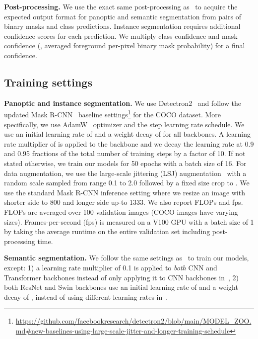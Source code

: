 \documentclass[10pt,twocolumn,letterpaper]{article}
\begin{document}
\noindent\textbf{Post-processing.} We use the exact same post-processing as~\cite{cheng2021maskformer} to acquire the expected output format for panoptic and semantic segmentation from pairs of binary masks and class predictions. Instance segmentation requires additional confidence scores for each prediction. We multiply class confidence and mask confidence (\ie, averaged foreground per-pixel binary mask probability) for a final confidence. 

\subsection{Training settings}
\noindent\textbf{Panoptic and instance segmentation.} We use Detectron2~\cite{wu2019detectron2} and follow the updated Mask R-CNN~\cite{he2017mask} baseline settings\footnote{\scriptsize \url{https://github.com/facebookresearch/detectron2/blob/main/MODEL\_ZOO.md\#new-baselines-using-large-scale-jitter-and-longer-training-schedule}} for the COCO dataset. More specifically, we use AdamW~\cite{loshchilov2018decoupled} optimizer and the step learning rate  schedule. We use an initial learning rate of  and a weight decay of  for all backbones. A learning rate multiplier of  is applied to the backbone and we decay the learning rate at 0.9 and 0.95 fractions of the total number of training steps by a factor of 10. If not stated otherwise, we train our models for 50 epochs with a batch size of 16. For data augmentation, we use the large-scale jittering (LSJ) augmentation~\cite{ghiasi2021simple,du2021simple} with a random scale sampled from range 0.1 to 2.0 followed by a fixed size crop to . We use the standard Mask R-CNN inference setting where we resize an image with shorter side to 800 and longer side up-to 1333. We also report FLOPs and fps. FLOPs are averaged over 100 validation images (COCO images have varying sizes). Frames-per-second (fps) is measured on a V100 GPU with a batch size of 1 by taking the average runtime on the entire validation set including post-processing time.

\noindent\textbf{Semantic segmentation.} We follow the same settings as~\cite{cheng2021maskformer} to train our models, except: 1) a learning rate multiplier of 0.1 is applied to \emph{both} CNN and Transformer backbones instead of only applying it to CNN backbones in~\cite{cheng2021maskformer},
2) both ResNet and Swin backbones use an initial learning rate of  and a weight decay of , instead of using different learning rates in~\cite{cheng2021maskformer}.
\end{document}
